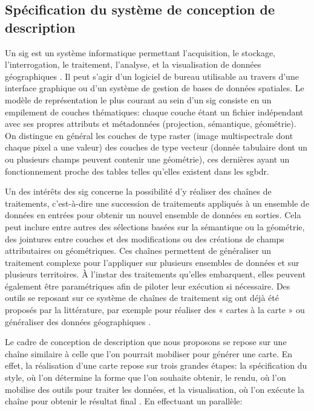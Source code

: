 \subsection{Spécification du système de conception de description}

Un \gls{sig} est un système informatique permettant l’acquisition, le stockage, l’interrogation, le traitement, l’analyse, et la visualisation de données géographiques \citep{AschanLeygonie2019}. Il peut s’agir d’un logiciel de bureau utilisable au travers d’une interface graphique ou d’un système de gestion de bases de données spatiales. Le modèle de représentation le plus courant au sein d'un \gls{sig} consiste en un empilement de couches thématiques: chaque couche étant un fichier indépendant avec ses propres attributs et métadonnées (projection, sémantique, géométrie). On distingue en général les couches de type raster (image multispectrale dont chaque pixel a une valeur) des couches de type vecteur (donnée tabulaire dont un ou plusieurs champs peuvent contenir une géométrie), ces dernières ayant un fonctionnement proche des tables telles qu’elles existent dans les \gls{sgbdr}. 

\newpar{}

Un des intérêts des \gls{sig} concerne la possibilité d’y réaliser des chaînes de traitements, c’est-à-dire une succession de traitements appliqués à un ensemble de données en entrées pour obtenir un nouvel ensemble de données en sorties. Cela peut inclure entre autres des sélections basées sur la sémantique ou la géométrie, des jointures entre couches et des modifications ou des créations de champs attributaires ou géométriques. Ces chaînes permettent de généraliser un traitement complexe pour l’appliquer sur plusieurs ensembles de données et sur plusieurs territoires. À l’instar des traitements qu’elles embarquent, elles peuvent également être paramétriques afin de piloter leur exécution si nécessaire. Des outils se reposant sur ce système de chaînes de traitement \gls{sig} ont déjà été proposés par la littérature, par exemple pour réaliser des « cartes à la carte » \citep{bucher2007} ou généraliser des données géographiques \citep{lee2001,petzold2006}.

\newpar{}

Le cadre de conception de description que nous proposons se repose sur une chaîne similaire à celle que l’on pourrait mobiliser pour générer une carte. En effet, la réalisation d’une carte repose sur trois grandes étapes: la spécification du style, où l’on détermine la forme que l’on souhaite obtenir, le rendu, où l’on mobilise des outils pour traiter les données, et la visualisation, où l’on exécute la chaîne pour obtenir le résultat final \cite{christophe2016}. En effectuant un parallèle:

